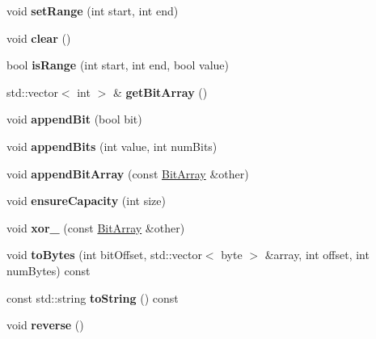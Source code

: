 \begin{DoxyCompactItemize}
\item 
\mbox{\label{classzxing_1_1_bit_array_a0c64d0f9ffa4c2f8574b234e9fe98725}} 
void {\bfseries set\+Range} (int start, int end)
\item 
\mbox{\label{classzxing_1_1_bit_array_a2b2e72ca612a9e865df9fcd4de24c6b5}} 
void {\bfseries clear} ()
\item 
\mbox{\label{classzxing_1_1_bit_array_a39999b1139756a0aa19b21c3be9406c3}} 
bool {\bfseries is\+Range} (int start, int end, bool value)
\item 
\mbox{\label{classzxing_1_1_bit_array_aff5ee27ff3d4a68d4b41ccbc59a46463}} 
std\+::vector$<$ int $>$ \& {\bfseries get\+Bit\+Array} ()
\item 
\mbox{\label{classzxing_1_1_bit_array_a2cc03537b5168d45d22f739e8ab4d91c}} 
void {\bfseries append\+Bit} (bool bit)
\item 
\mbox{\label{classzxing_1_1_bit_array_accc491fb19e26985bdc1565323201125}} 
void {\bfseries append\+Bits} (int value, int num\+Bits)
\item 
\mbox{\label{classzxing_1_1_bit_array_a958cacbd7cea73709e3b76da619363bd}} 
void {\bfseries append\+Bit\+Array} (const \mbox{\hyperlink{classzxing_1_1_bit_array}{Bit\+Array}} \&other)
\item 
\mbox{\label{classzxing_1_1_bit_array_ac2d023c452cd4094ca5657500f36c55f}} 
void {\bfseries ensure\+Capacity} (int size)
\item 
\mbox{\label{classzxing_1_1_bit_array_acb1fc952f67e7f0afcabc89bf84f042c}} 
void {\bfseries xor\+\_\+} (const \mbox{\hyperlink{classzxing_1_1_bit_array}{Bit\+Array}} \&other)
\item 
\mbox{\label{classzxing_1_1_bit_array_a5bf776249704951437d307859759560c}} 
void {\bfseries to\+Bytes} (int bit\+Offset, std\+::vector$<$ byte $>$ \&array, int offset, int num\+Bytes) const
\item 
\mbox{\label{classzxing_1_1_bit_array_af44ad61d4fe9c38a99f67b3eae85f314}} 
const std\+::string {\bfseries to\+String} () const
\item 
\mbox{\label{classzxing_1_1_bit_array_a0e06d87aef2856d32d3dc3ae1c8d7005}} 
void {\bfseries reverse} ()
\end{DoxyCompactItemize}
